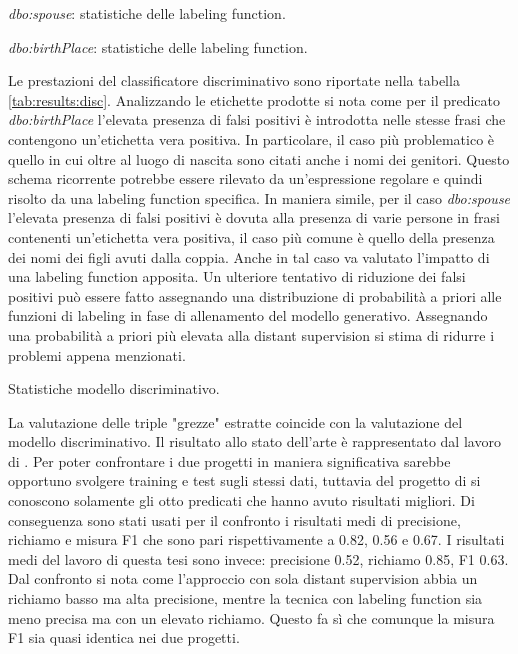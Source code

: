 \begin{table}[H]
\caption{\textit{dbo:spouse}: statistiche delle labeling function.}
\label{tab:results:lfs1}
\end{table}

\begin{table}[H]
\caption{\textit{dbo:birthPlace}: statistiche delle labeling function.}
\label{tab:results:lfs2}
\end{table}




Le prestazioni del classificatore discriminativo sono riportate nella tabella \ref{tab:results:disc}. Analizzando le etichette prodotte si nota come per il predicato \textit{dbo:birthPlace} l'elevata presenza di falsi positivi è introdotta nelle stesse frasi che contengono un'etichetta vera positiva. In particolare, il caso più problematico è quello in cui oltre al luogo di nascita sono citati anche i nomi dei genitori. Questo schema ricorrente potrebbe essere rilevato da un'espressione regolare e quindi risolto da una labeling function specifica. In maniera simile, per il caso \textit{dbo:spouse} l'elevata presenza di falsi positivi è dovuta alla presenza di varie persone in frasi contenenti un'etichetta vera positiva, il caso più comune è quello della presenza dei nomi dei figli avuti dalla coppia. Anche in tal caso va valutato l'impatto di una labeling function apposita.
Un ulteriore tentativo di riduzione dei falsi positivi può essere fatto assegnando una distribuzione di probabilità a priori alle funzioni di labeling in fase di allenamento del modello generativo. Assegnando una probabilità a priori più elevata alla distant supervision si stima di ridurre i problemi appena menzionati.

\begin{table}[H]
\caption{ Statistiche modello discriminativo.}
\label{tab:results:disc}
\end{table}

La valutazione delle triple "grezze" estratte coincide con la valutazione del modello discriminativo. Il risultato allo stato dell'arte è rappresentato dal lavoro di \citet{Nguyen2011EndtoEndRE}. Per poter confrontare i due progetti in maniera significativa sarebbe opportuno svolgere training e test sugli stessi dati, tuttavia del progetto di \citet{Nguyen2011EndtoEndRE} si conoscono solamente gli otto predicati che hanno avuto risultati migliori. Di conseguenza sono stati usati per il confronto i risultati medi di precisione, richiamo e misura F1 che sono pari rispettivamente a 0.82, 0.56 e 0.67. I risultati medi del lavoro di questa tesi sono invece: precisione 0.52, richiamo 0.85, F1 0.63. Dal confronto si nota come l'approccio con sola distant supervision abbia un richiamo basso ma alta precisione, mentre la tecnica con labeling function sia meno precisa ma con un elevato richiamo. Questo fa sì che comunque la misura F1 sia quasi identica nei due progetti.

